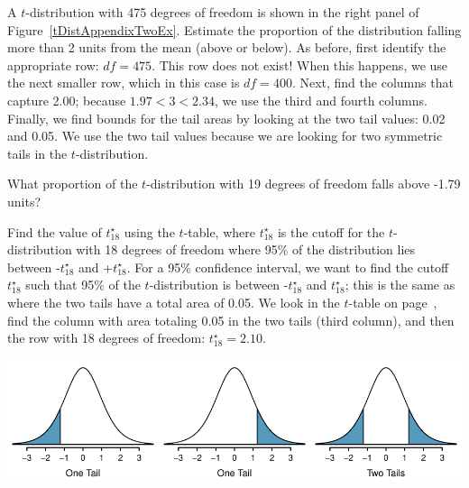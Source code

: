 \begin{examplewrap}
\begin{nexample}{A $t$-distribution with 475 degrees of freedom
    is shown in the right panel of
    Figure~\ref{tDistAppendixTwoEx}.
    Estimate the proportion of the distribution falling more
    than 2 units from the mean (above or below).}
  As before, first identify the appropriate row: $df=475$.
  This row does not exist!
  When this happens, we use the next smaller row, which in
  this case is $df = 400$.
  Next, find the columns that capture 2.00;
  because $1.97 < 3 < 2.34$, we use the third and fourth columns.
  Finally, we find bounds for the tail areas by looking at
  the two tail values: 0.02 and 0.05.
  We use the two tail values because we are looking for two
  symmetric tails in the $t$-distribution.
\end{nexample}
\end{examplewrap}

\begin{exercisewrap}
\begin{nexercise}
What proportion of the $t$-distribution with 19 degrees of freedom falls above -1.79 units?\footnotemark{}
\end{nexercise}
\end{exercisewrap}

\begin{examplewrap}
\begin{nexample}{Find the value of $t_{18}^{\star}$
    using the $t$-table, where $t_{18}^{\star}$
    is the cutoff for the $t$-distribution with
    18 degrees of freedom where 95\% of the distribution
    lies between -$t_{18}^{\star}$ and +$t_{18}^{\star}$.}
  For a 95\% confidence interval, we want to find
  the cutoff $t^{\star}_{18}$ such that 95\% of the
  $t$-distribution is between -$t^{\star}_{18}$
  and $t^{\star}_{18}$;
  this is the same as where the two tails have a total
  area of 0.05.
  We look in the $t$-table on page~\pageref{tTableSample},
  find the column with area totaling 0.05 in the two tails
  (third column), and then the row with 18 degrees of
  freedom: $t^{\star}_{18} = 2.10$.
\end{nexample}
\end{examplewrap}


\newpage

\begin{center}
\includegraphics[width=\textwidth]
    {extraTeX/tables/figures/tTails/tTails}
\end{center}

